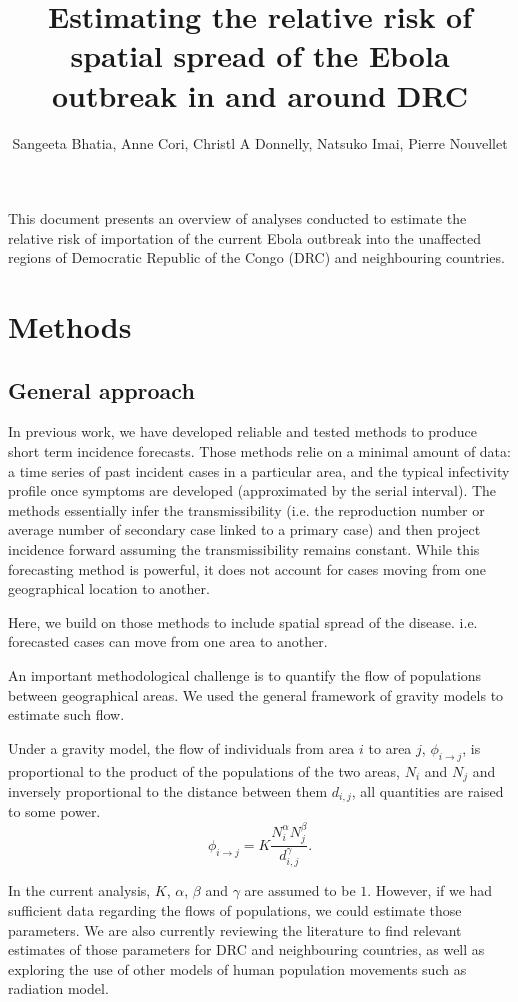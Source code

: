 \documentclass[11pt,]{article}
\title{Estimating the relative risk of spatial spread of the Ebola
  outbreak in and around DRC}
\author{Sangeeta Bhatia, Anne Cori, Christl A Donnelly,
   Natsuko Imai, Pierre Nouvellet}
\begin{document}
\maketitle
This document presents an overview of analyses conducted to estimate the relative
risk of importation of the current Ebola outbreak into the unaffected
regions of
Democratic Republic of the Congo (DRC) and neighbouring countries.

\section*{Methods}

\subsection*{General approach}

In previous work, we have developed reliable and tested methods
\citep{cori2013new, who2014ebola, nouvellet2017simple} to produce
short term incidence forecasts.
Those methods relie on a minimal amount of data: a time series of
past incident cases in a particular area, and the typical infectivity profile once
symptoms are developed (approximated by the serial interval).
The methods essentially infer the transmissibility (i.e. the
reproduction number or average number of secondary case linked to a
primary case)
and then project incidence forward assuming the transmissibility
remains constant.
While this forecasting method is powerful, it does not account for cases moving from one geographical location to another.

Here, we build on those methods to include spatial spread of the
disease. i.e. forecasted cases can move from one area to another.

An important methodological challenge is to quantify the flow of
populations between geographical areas.
We used the general framework of gravity models to estimate such flow.

Under a gravity model, the flow of individuals from area \(i\) to area \(j\),
\(\phi_{i \rightarrow j}\), is proportional to the product of the
populations of the two areas, \(N_i\) and \(N_j\) and inversely
proportional to the distance between them \(d_{i, j}\), all quantities
are raised to some power.
\[
  \phi_{i \rightarrow j} = K \frac{N_i^{\alpha}N_j^{\beta}}{d_{i, j}^{\gamma}}.
\]

In the current analysis, \(K\), \( \alpha \), \( \beta \) and \(\gamma\) 
are assumed to be $1$. However, if we had sufficient data regarding
the flows of populations, we could estimate those parameters.
We are also currently reviewing the literature to find relevant
estimates of those parameters for DRC and neighbouring countries,
as well as exploring the use of other models of human population movements such as radiation model. 
\end{document}
